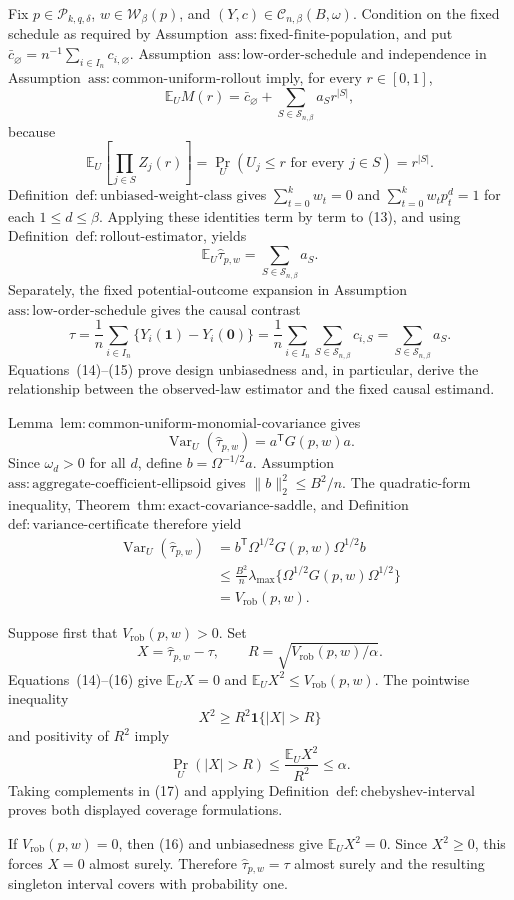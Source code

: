 Fix \(p\in\mathcal P_{k,q,\delta}\), \(w\in\mathcal W_\beta(p)\), and \((Y,c)\in\mathcal C_{n,\beta}(B,\omega)\).  Condition on the fixed schedule as required by Assumption~\(\mathrm{ass{:}fixed\text{-}finite\text{-}population}\), and put \(\bar c_{\varnothing}=n^{-1}\sum_{i\in I_n}c_{i,\varnothing}\).  Assumption~\(\mathrm{ass{:}low\text{-}order\text{-}schedule}\) and independence in Assumption~\(\mathrm{ass{:}common\text{-}uniform\text{-}rollout}\) imply, for every \(r\in[0,1]\),
\[
\mathbb E_U M(r)
=\bar c_{\varnothing}
+\sum_{S\in\mathcal S_{n,\beta}}a_Sr^{|S|},
\tag{13}
\]
because
\[
\mathbb E_U\!\left[\prod_{j\in S}Z_j(r)\right]
=\Pr_U(U_j\le r\text{ for every }j\in S)=r^{|S|}.
\]
Definition~\(\mathrm{def{:}unbiased\text{-}weight\text{-}class}\) gives \(\sum_{t=0}^kw_t=0\) and \(\sum_{t=0}^kw_tp_t^d=1\) for each \(1\le d\le\beta\).  Applying these identities term by term to (13), and using Definition~\(\mathrm{def{:}rollout\text{-}estimator}\), yields
\[
\mathbb E_U\widehat\tau_{p,w}
=\sum_{S\in\mathcal S_{n,\beta}}a_S.
\tag{14}
\]
Separately, the fixed potential-outcome expansion in Assumption~\(\mathrm{ass{:}low\text{-}order\text{-}schedule}\) gives the causal contrast
\[
\tau
=\frac1n\sum_{i\in I_n}\{Y_i(\mathbf1)-Y_i(\mathbf0)\}
=\frac1n\sum_{i\in I_n}\sum_{S\in\mathcal S_{n,\beta}}c_{i,S}
=\sum_{S\in\mathcal S_{n,\beta}}a_S.
\tag{15}
\]
Equations~(14)--(15) prove design unbiasedness and, in particular, derive the relationship between the observed-law estimator and the fixed causal estimand.

Lemma~\(\mathrm{lem{:}common\text{-}uniform\text{-}monomial\text{-}covariance}\) gives
\[
\operatorname{Var}_U(\widehat\tau_{p,w})=a^{\mathsf T}G(p,w)a.
\]
Since \(\omega_d>0\) for all \(d\), define \(b=\Omega^{-1/2}a\).  Assumption~\(\mathrm{ass{:}aggregate\text{-}coefficient\text{-}ellipsoid}\) gives \(\lVert b\rVert_2^2\le B^2/n\).  The quadratic-form inequality, Theorem~\(\mathrm{thm{:}exact\text{-}covariance\text{-}saddle}\), and Definition~\(\mathrm{def{:}variance\text{-}certificate}\) therefore yield
\[
\begin{aligned}
\operatorname{Var}_U(\widehat\tau_{p,w})
&=b^{\mathsf T}\Omega^{1/2}G(p,w)\Omega^{1/2}b\\
&\le \frac{B^2}{n}
\lambda_{\max}\{\Omega^{1/2}G(p,w)\Omega^{1/2}\}\\
&=V_{\mathrm{rob}}(p,w).
\end{aligned}
\tag{16}
\]

Suppose first that \(V_{\mathrm{rob}}(p,w)>0\).  Set
\[
X=\widehat\tau_{p,w}-\tau,
\qquad
R=\sqrt{V_{\mathrm{rob}}(p,w)/\alpha}.
\]
Equations~(14)--(16) give \(\mathbb E_UX=0\) and \(\mathbb E_UX^2\le V_{\mathrm{rob}}(p,w)\).  The pointwise inequality
\[
X^2\ge R^2\mathbf1\{|X|>R\}
\]
and positivity of \(R^2\) imply
\[
\Pr_U(|X|>R)
\le\frac{\mathbb E_UX^2}{R^2}
\le\alpha.
\tag{17}
\]
Taking complements in (17) and applying Definition~\(\mathrm{def{:}chebyshev\text{-}interval}\) proves both displayed coverage formulations.

If \(V_{\mathrm{rob}}(p,w)=0\), then (16) and unbiasedness give \(\mathbb E_UX^2=0\).  Since \(X^2\ge0\), this forces \(X=0\) almost surely.  Therefore \(\widehat\tau_{p,w}=\tau\) almost surely and the resulting singleton interval covers with probability one.